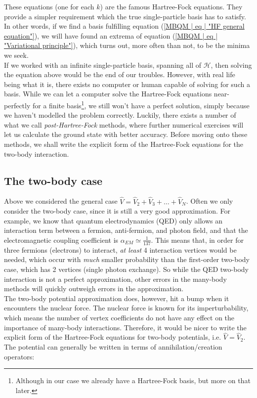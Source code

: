 \documentclass[10pt,twoside]{report}
\begin{document}
	These equations (one for each $k$) are the famous Hartree-Fock equations. They provide a simpler requirement which the true single-particle basis has to satisfy. 
	In other words, if we find a basis fulfilling equation (\ref{MBQM | eq | "HF general equation"}), we will have found an extrema of equation (\ref{MBQM | eq | "Variational principle"}), which turns out, more often than not, to be the minima we seek.\\
	
	If we worked with an infinite single-particle basis, spanning all of $\mathcal{H}$, then solving the equation above would be the end of our troubles. However, with real life being what it is, there exists no computer or human capable of solving for such a basis. While we can let a computer solve the Hartree-Fock equations near-perfectly for a finite basis\footnote{Although in our case we already have a Hartree-Fock basis, but more on that later.}, we still won't have a perfect solution, simply because we haven't modelled the problem correctly. Luckily, there exists a number of what we call \emph{post-Hartree-Fock} methods, where further numerical exercises will let us calculate the ground state with better accuracy. Before moving onto these methods, we shall write the explicit form of the Hartree-Fock equations for the two-body interaction.
	
	\subsection{The two-body case}
	Above we considered the general case $\hat{V} = \hat{V}_2 + \hat{V}_3 + \ldots + \hat{V}_N$. Often we only consider the two-body case, since it is still a very good approximation. For example, we know that quantum electrodynamics (QED) only allows an interaction term between a fermion, anti-fermion, and photon field, and that the electromagnetic coupling coefficient is $\alpha_{EM} \simeq \frac{1}{137}$. This means that, in order for three fermions (electrons) to interact, \emph{at least} 4 interaction vertices would be needed, which occur with \emph{much} smaller probability than the first-order two-body case, which has 2 vertices (single photon exchange). So while the QED two-body interaction is not a perfect approximation, other errors in the many-body methods will quickly outweigh errors in the approximation.\\
	
	The two-body potential approximation does, however, hit a bump when it encounters the nuclear force. The nuclear force is known for its imperturbability, which means the number of vertex coefficients do not have any effect on the importance of many-body interactions.
	Therefore, it would be nicer to write the explicit form of the Hartree-Fock equations for two-body potentials, i.e. $\hat{V} = \hat{V}_2$. The potential can generally be written in terms of annihilation/creation operators:
	
\end{document}
